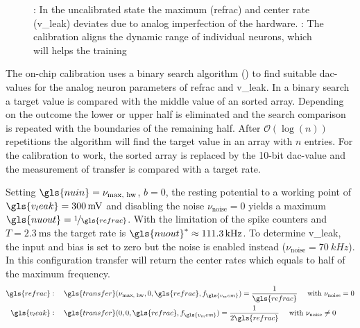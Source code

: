\begin{figure}
	\centering
	\begin{subfigure}[b]{0.47\textwidth}
	\caption{}
	
	\label{transferfunction_wout_calib}
	\end{subfigure}
	\begin{subfigure}[b]{0.47\textwidth}		
	\caption{}
	
	\label{transferfunction_w_calib}
	\end{subfigure}
	\caption{: In the uncalibrated state the maximum (\gls{refrac}) and center rate (\gls{v_leak}) deviates due to analog imperfection of the hardware. : The calibration aligns the dynamic range of individual neurons, which will helps the training}
\end{figure}

The on-chip calibration uses a binary search algorithm (\cite{binarysearchsource}) to find suitable \gls{dac}-values for the analog neuron parameters of \gls{refrac} and \gls{v_leak}. In a binary search a target value is compared with the middle value of an sorted array. Depending on the outcome the lower or upper half is eliminated and the search comparison is repeated with the boundaries of the remaining half. After $\mathcal{O}(\log(n))$ repetitions the algorithm will find the target value in an array with $n$ entries. For the calibration to work, the sorted array is replaced by the 10-bit \gls{dac}-value and the measurement of \gls{transfer} is compared with a target rate.

Setting $\gls{nuin} = \nu_\text{max, hw}$, $b=0$, the resting potential to a working point of $\gls{v_leak} = \SI{300}{\milli \V}$ and disabling the noise $\nu_\text{noise} = 0$ yields a maximum $\gls{nuout} = \nicefrac{1}{\gls{refrac}}$. With the limitation of the spike counters and $T = \SI{2.3}{\milli \s} $ the target rate is $\gls{nuout}^* \approx \SI{111.3}{\kilo \Hz}$. To determine \gls{v_leak}, the input and bias is set to zero but the noise is enabled instead ($\nu_\text{noise} = \SI{70}{kHz}$). In this configuration \gls{transfer} will return the center rates which equals to half of the maximum frequency.
\begin{align*}\label{calibration_config}
\gls{refrac}&:\quad \gls{transfer}(\nu_\text{max, hw}, 0, \gls{refrac}, f_{\gls{v_mem}}) = \frac{1}{\gls{refrac}} \quad \text{ with } \nu_\text{noise} = 0\\
\gls{v_leak}&:\quad \gls{transfer}(0, 0, \gls{refrac}, f_{\gls{v_mem}}) = \frac{1}{2\gls{refrac}} \quad \text{ with } \nu_\text{noise} \neq 0
\end{align*}

